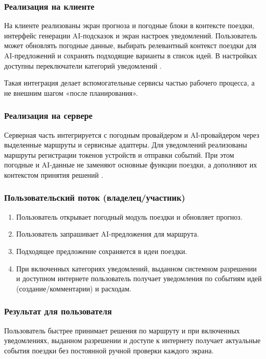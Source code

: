 \subsubsection{Реализация на клиенте}
На клиенте реализованы экран прогноза и погодные блоки в контексте поездки, интерфейс генерации AI-подсказок и экран настроек уведомлений. Пользователь может обновлять погодные данные, выбирать релевантный контекст поездки для AI-предложений и сохранять подходящие варианты в список идей. В настройках доступны переключатели категорий уведомлений .

Такая интеграция делает вспомогательные сервисы частью рабочего процесса, а не внешним шагом «после планирования».

\subsubsection{Реализация на сервере}
Серверная часть интегрируется с погодным провайдером и AI-провайдером через выделенные маршруты и сервисные адаптеры. Для уведомлений реализованы маршруты регистрации токенов устройств и отправки событий. При этом погодные и AI-данные не заменяют основные функции поездки, а дополняют их контекстом принятия решений .

\subsubsection{Пользовательский поток (владелец/участник)}
\begin{enumerate}
    \item Пользователь открывает погодный модуль поездки и обновляет прогноз.
    \item Пользователь запрашивает AI-предложения для маршрута.
    \item Подходящее предложение сохраняется в идеи поездки.
    \item При включенных категориях уведомлений, выданном системном разрешении и доступном интернете пользователь получает уведомления по событиям идей (создание/комментарии) и расходам.
\end{enumerate}

\subsubsection{Результат для пользователя}
Пользователь быстрее принимает решения по маршруту и при включенных уведомлениях, выданном разрешении и доступе к интернету получает актуальные события поездки без постоянной ручной проверки каждого экрана.

